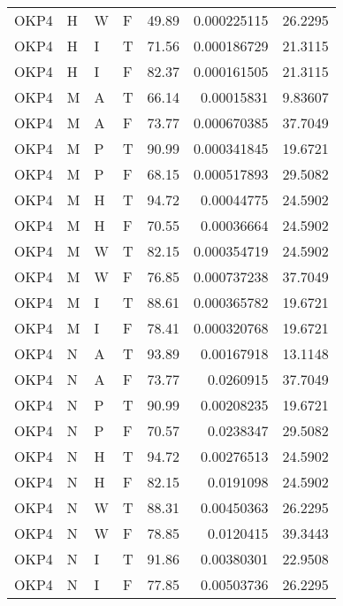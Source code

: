 \begin{table}[htb!]
{\begin{tabular}{llllrrr}
            OKP4     & H     & W     & F          & 49.89      & 0.000225115 & 26.2295  \\
            OKP4     & H     & I     & T          & 71.56      & 0.000186729 & 21.3115  \\
            OKP4     & H     & I     & F          & 82.37      & 0.000161505 & 21.3115  \\
            OKP4     & M     & A     & T          & 66.14      & 0.00015831  & 9.83607  \\
            OKP4     & M     & A     & F          & 73.77      & 0.000670385 & 37.7049  \\
            OKP4     & M     & P     & T          & 90.99      & 0.000341845 & 19.6721  \\
            OKP4     & M     & P     & F          & 68.15      & 0.000517893 & 29.5082  \\
            OKP4     & M     & H     & T          & 94.72      & 0.00044775  & 24.5902  \\
            OKP4     & M     & H     & F          & 70.55      & 0.00036664  & 24.5902  \\
            OKP4     & M     & W     & T          & 82.15      & 0.000354719 & 24.5902  \\
            OKP4     & M     & W     & F          & 76.85      & 0.000737238 & 37.7049  \\
            OKP4     & M     & I     & T          & 88.61      & 0.000365782 & 19.6721  \\
            OKP4     & M     & I     & F          & 78.41      & 0.000320768 & 19.6721  \\
            OKP4     & N     & A     & T          & 93.89      & 0.00167918  & 13.1148  \\
            OKP4     & N     & A     & F          & 73.77      & 0.0260915   & 37.7049  \\
            OKP4     & N     & P     & T          & 90.99      & 0.00208235  & 19.6721  \\
            OKP4     & N     & P     & F          & 70.57      & 0.0238347   & 29.5082  \\
            OKP4     & N     & H     & T          & 94.72      & 0.00276513  & 24.5902  \\
            OKP4     & N     & H     & F          & 82.15      & 0.0191098   & 24.5902  \\
            OKP4     & N     & W     & T          & 88.31      & 0.00450363  & 26.2295  \\
            OKP4     & N     & W     & F          & 78.85      & 0.0120415   & 39.3443  \\
            OKP4     & N     & I     & T          & 91.86      & 0.00380301  & 22.9508  \\
            OKP4     & N     & I     & F          & 77.85      & 0.00503736  & 26.2295  \\
            \hline
        \end{tabular}
    }{
    }
\end{table} 
